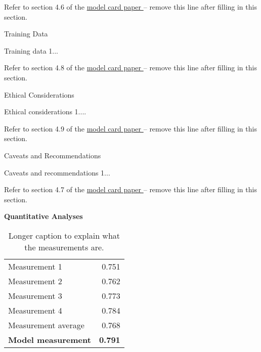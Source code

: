 \documentclass[conference]{IEEEtran}
\begin{document}
\begin{adjustwidth}{-60pt}{-30pt}
\begin{singlespace}
\begin{tcolorbox}[title=\textbf{Model Card - CheXNet},
    breakable, sharp corners, boxrule=0.7pt]
{Refer to section 4.6 of the \href{https://arxiv.org/abs/1810.03993}{model card paper } -- remove this line after filling in this section.

\begin{mcsection}{Training Data}
    \item Training data 1...
\end{mcsection}

\pagebreak

Refer to section 4.8 of the \href{https://arxiv.org/abs/1810.03993}{model card paper } -- remove this line after filling in this section.

\begin{mcsection}{Ethical Considerations}
    \item Ethical considerations 1....
\end{mcsection}

Refer to section 4.9 of the \href{https://arxiv.org/abs/1810.03993}{model card paper } -- remove this line after filling in this section.

\begin{mcsection}{Caveats and Recommendations}
    \item Caveats and recommendations 1...
\end{mcsection}

Refer to section 4.7 of the \href{https://arxiv.org/abs/1810.03993}{model card paper } -- remove this line after filling in this section.

\textbf{Quantitative Analyses}

\begin{table}[H]
\centering
\small{
\begin{tabular}{lr}
Measurement 1       & 0.751  \\
Measurement 2       & 0.762 \\
Measurement 3       & 0.773 \\
Measurement 4       & 0.784 \\
Measurement average & 0.768  \\ \hline
\textbf{Model measurement}  & \textbf{0.791} \\ \hline
\end{tabular} } \\
\caption[Short caption used in list of tables.]{\small{Longer caption to explain what the measurements are.}}
\end{table}

} %
\end{tcolorbox}
\end{singlespace}
\end{adjustwidth}
\end{document}
